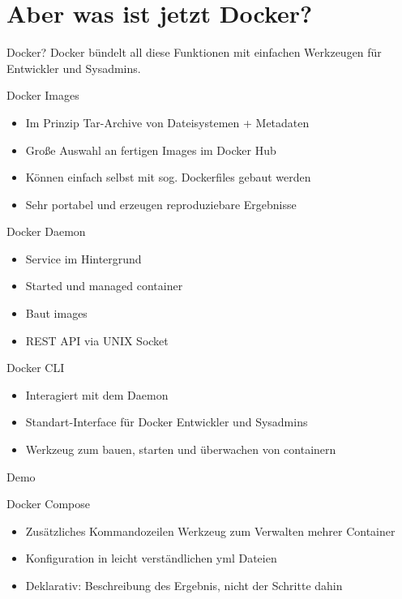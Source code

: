 \documentclass{beamer}
\begin{document}
  \section{Aber was ist jetzt Docker?}

  \begin{frame}{Docker?}
    Docker bündelt all diese Funktionen mit einfachen Werkzeugen für Entwickler
    und Sysadmins.
  \end{frame}
  \begin{frame}{Docker Images}
    \begin{itemize}[<+->]
      \item Im Prinzip Tar-Archive von Dateisystemen + Metadaten
      \item Große Auswahl an fertigen Images im Docker Hub
      \item Können einfach selbst mit sog. Dockerfiles gebaut werden
      \item Sehr portabel und erzeugen reproduziebare Ergebnisse
    \end{itemize}
  \end{frame}
  \begin{frame}{Docker Daemon}
    \begin{itemize}[<+->]
      \item Service im Hintergrund
      \item Started und managed container
      \item Baut images
      \item REST API via UNIX Socket
    \end{itemize}
  \end{frame}
  \begin{frame}{Docker CLI}
    \begin{itemize}[<+->]
      \item Interagiert mit dem Daemon
      \item Standart-Interface für Docker Entwickler und Sysadmins
      \item Werkzeug zum bauen, starten und überwachen von containern
    \end{itemize}
  \end{frame}
  \begin{frame}[standout]
    Demo
  \end{frame}
  \begin{frame}{Docker Compose}
    \begin{itemize}
      \item Zusätzliches Kommandozeilen Werkzeug zum Verwalten mehrer Container
      \item Konfiguration in leicht verständlichen yml Dateien
      \item Deklarativ: Beschreibung des Ergebnis, nicht der Schritte dahin
    \end{itemize}
  \end{frame}
  
\end{document}
